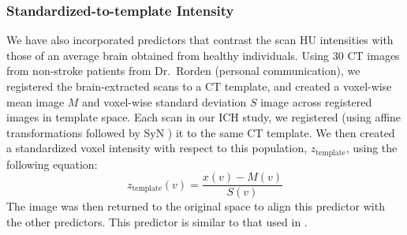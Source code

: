 \documentclass{elsarticle_nonatbib}\usepackage[]{graphicx}\usepackage[]{color}
\begin{document}
\subsubsection{Standardized-to-template Intensity}
We have also incorporated predictors that contrast the scan HU intensities with those of an average brain obtained from healthy individuals.  Using $30$ CT images from non-stroke patients from Dr.~Rorden (personal communication), we registered the brain-extracted scans to a CT template, and created a voxel-wise mean image $M$ and voxel-wise standard deviation $S$ image across registered images in template space.  Each scan in our ICH study, we registered (using affine transformations followed by SyN \citep{avants_symmetric_2008}) it to the same CT template. We then  created a standardized voxel intensity with respect to this population, $z_{\text{template}}$, using the following equation:
$$
z_{\text{template}}(v) = \frac{x(v) - M(v)}{S(v)}
$$
The image was then returned to the original space to align this predictor with the other predictors.  This predictor is similar to that used in \citet{gillebert_automated_2014}.


\end{document}
